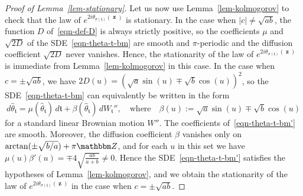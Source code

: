 \documentclass[11pt]{article}
\theoremstyle{plain}
\theoremstyle{definition}
\numberwithin{equation}{section}
\newcommand{\eqb}{\begin{equation}}
\newcommand{\eqe}{\end{equation}}
\newcommand{\BB}{\mathbbm}
\newcommand{\op}{\operatorname}
\newcommand{\wh}{\widehat}
\newcommand{\zz}{{\op{\mathbf{z}}}}
\newcommand{\tz}{{\mathfrak t}}
\begin{document}
\begin{proof}[Proof of Lemma~\ref{lem-stationary}]
Let us now use Lemma~\ref{lem-kolmogorov} to check that the law of $e^{2i \theta_{\sigma(\tz)}(\zz)}$ is stationary. 
In the case when $|c| \not= \sqrt{a b}$, the function $D$ of~\eqref{eqn-def-D} is always strictly positive, so the coefficients $\mu$ and $\sqrt{2D}$ of the SDE~\eqref{eqn-theta-t-bm} are smooth and $\pi$-periodic and the diffusion coefficient $\sqrt{2 D }$ never vanishes. Hence, the stationarity of the law of $ e^{2i \theta_{\sigma(\tz)}(\zz)} $ is immediate from Lemma~\ref{lem-kolmogorov} in this case. In the case when $c = \pm \sqrt{a b}$, we have $2 D(u) = (\sqrt{a } \sin (u) \mp \sqrt{b} \cos(u))^2 $, so the SDE~\eqref{eqn-theta-t-bm} can equivalently be written in the form
\eqb \label{eqn-theta-t-bm'}
d\wh\theta_\tz = \mu(\wh\theta_\tz) \, d\tz  +   \beta(\wh\theta_\tz) \,dW_\tz'' , \quad \text{where} \quad \beta(u) := \sqrt{a } \sin (u) \mp \sqrt{b} \cos(u) 
\eqe
for a standard linear Brownian motion $W''$. 
The coefficients of~\eqref{eqn-theta-t-bm'} are smooth. Moreover, the diffusion coefficient $\beta$ vanishes only on $\arctan(\pm \sqrt{b/a}) + \pi \BB Z$, and for each $u$ in this set we have $\mu(u) \beta'(u) = \mp 4 \sqrt{\frac{ab}{a+b}} \not=0$. Hence the SDE~\eqref{eqn-theta-t-bm'} satisfies the hypotheses of Lemma~\ref{lem-kolmogorov}, and we obtain the stationarity of the law of $ e^{2i \theta_{\sigma(\tz)}(\zz)} $ in the case when $c = \pm\sqrt{ab}$.
\end{proof}


 

\end{document}

